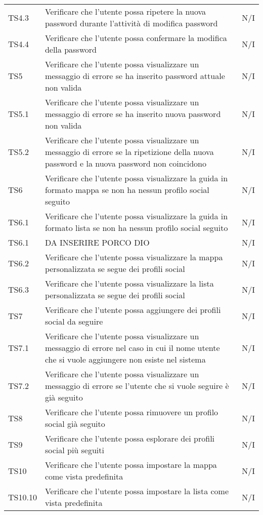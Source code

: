 {\begin{longtable}{C{.3\freewidth} C{.5\freewidth} C{.3\freewidth}}
    TS4.3 & Verificare che l'utente possa ripetere la nuova password durante l'attività di modifica password& N/I  \\
    TS4.4 & Verificare che l'utente possa confermare la modifica della password & N/I  \\
    TS5 & Verificare che l'utente possa visualizzare un messaggio di errore se ha inserito password attuale  non valida & N/I  \\
    TS5.1 & Verificare che l'utente possa visualizzare un messaggio di errore se ha inserito nuova password non valida & N/I  \\
    TS5.2 & Verificare che l'utente possa visualizzare un messaggio di errore se la ripetizione della nuova password e la nuova password non coincidono & N/I  \\
    TS6 & Verificare che l'utente possa visualizzare la guida in formato mappa se non ha nessun profilo social seguito & N/I  \\
    TS6.1 & Verificare che l'utente possa visualizzare la guida in formato lista se non ha nessun profilo social seguito & N/I  \\
    TS6.1& DA INSERIRE PORCO DIO & N/I  \\
    TS6.2 & Verificare che l'utente possa visualizzare la mappa personalizzata se segue dei profili social & N/I  \\
    TS6.3 & Verificare che l'utente possa visualizzare la lista personalizzata se segue dei profili social & N/I  \\
    TS7 & Verificare che l'utente possa aggiungere dei profili social da seguire & N/I  \\
    TS7.1 & Verificare che l'utente possa visualizzare un messaggio di errore nel caso in cui il nome utente che si vuole aggiungere non esiste nel sistema & N/I  \\
    TS7.2 & Verificare che l'utente possa visualizzare un messaggio di errore se l'utente che si vuole seguire è già seguito & N/I  \\
    TS8 & Verificare che l'utente possa rimuovere un profilo social già seguito & N/I  \\
    TS9 & Verificare che l'utente possa esplorare dei profili social più seguiti & N/I  \\
    TS10 & Verificare che l'utente possa impostare  la mappa come vista predefinita & N/I  \\
    TS10.10 & Verificare che l'utente possa impostare  la lista come vista predefinita & N/I  \\
    \bottomrule
\end{longtable}
    
}
